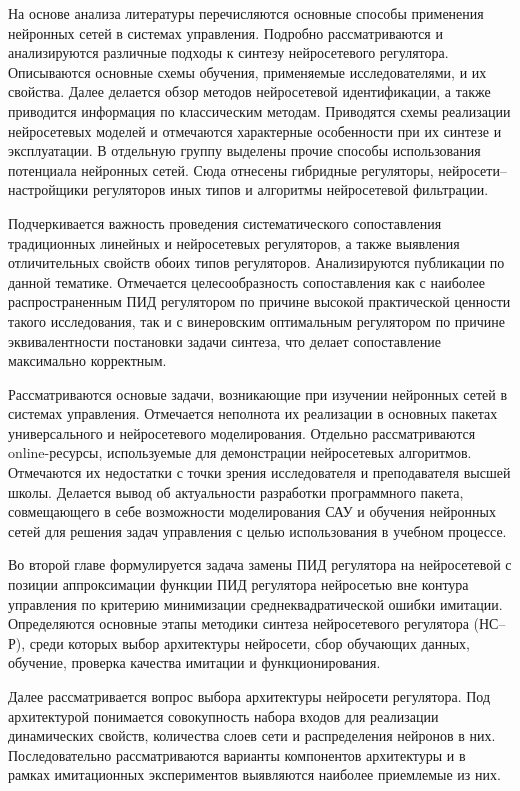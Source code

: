 На основе анализа литературы перечисляются основные способы применения
нейронных сетей в системах управления.  Подробно рассматриваются и
анализируются различные подходы к синтезу нейросетевого регулятора.
Описываются основные схемы обучения, применяемые исследователями, и их
свойства.  Далее делается обзор методов нейросетевой идентификации, а
также приводится информация по классическим методам.  Приводятся схемы
реализации нейросетевых моделей и отмечаются характерные особенности
при их синтезе и эксплуатации.  В отдельную группу выделены прочие
способы использования потенциала нейронных сетей.  Сюда отнесены
гибридные регуляторы, нейросети--настройщики регуляторов иных типов и
алгоритмы нейросетевой фильтрации.

Подчеркивается важность проведения систематического сопоставления
традиционных линейных и нейросетевых регуляторов, а также выявления
отличительных свойств обоих типов регуляторов.  Анализируются
публикации по данной тематике.  Отмечается целесообразность
сопоставления как с наиболее распространенным ПИД регулятором по
причине высокой практической ценности такого исследования, так и с
винеровским оптимальным регулятором по причине эквивалентности
постановки задачи синтеза, что делает сопоставление максимально
корректным.

Рассматриваются основые задачи, возникающие при изучении нейронных
сетей в системах управления.  Отмечается неполнота их реализации в
основных пакетах универсального и нейросетевого моделирования.
Отдельно рассматриваются online-ресурсы, используемые для демонстрации
нейросетевых алгоритмов.  Отмечаются их недостатки с точки зрения
исследователя и преподавателя высшей школы.  Делается вывод об
актуальности разработки программного пакета, совмещающего в себе
возможности моделирования САУ и обучения нейронных сетей для решения
задач управления с целью использования в учебном процессе.


Во второй главе формулируется задача замены ПИД регулятора на
нейросетевой с позиции аппроксимации функции ПИД регулятора нейросетью
вне контура управления по критерию минимизации среднеквадратической
ошибки имитации.  Определяются основные этапы методики синтеза
нейросетевого регулятора (НС--Р), среди которых выбор архитектуры
нейросети, сбор обучающих данных, обучение, проверка качества имитации
и функционирования.

Далее рассматривается вопрос выбора архитектуры нейросети регулятора.
Под архитектурой понимается совокупность набора входов для реализации
динамических свойств, количества слоев сети и распределения нейронов в
них.  Последовательно рассматриваются варианты компонентов архитектуры
и в рамках имитационных экспериментов выявляются наиболее приемлемые
из них.

